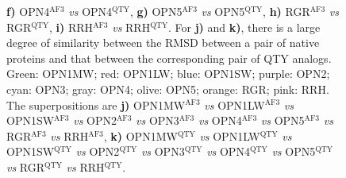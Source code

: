 \documentclass[fleqn, 10pt]{manuscript}
\begin{document}
\begin{figure}[htbp]
{    \textbf{f)} OPN4$^{\textrm{AF3}}$ \textit{vs} OPN4$^{\textrm{QTY}}$, 
    \textbf{g)} OPN5$^{\textrm{AF3}}$ \textit{vs} OPN5$^{\textrm{QTY}}$, 
    \textbf{h)} RGR$^{\textrm{AF3}}$ \textit{vs} RGR$^{\textrm{QTY}}$, 
    \textbf{i)} RRH$^{\textrm{AF3}}$ \textit{vs} RRH$^{\textrm{QTY}}$. 
    For \textbf{j)} and \textbf{k)}, there is a large degree of similarity between the RMSD between a pair of native proteins and that between the corresponding pair of QTY analogs. Green: OPN1MW; red: OPN1LW; blue: OPN1SW; purple: OPN2; cyan: OPN3; gray: OPN4; olive: OPN5; orange: RGR; pink: RRH. The superpositions are
    \textbf{j)} OPN1MW$^{\textrm{AF3}}$ \textit{vs} OPN1LW$^{\textrm{AF3}}$ \textit{vs} OPN1SW$^{\textrm{AF3}}$ \textit{vs} OPN2$^{\textrm{AF3}}$ \textit{vs} OPN3$^{\textrm{AF3}}$ \textit{vs} OPN4$^{\textrm{AF3}}$ \textit{vs} OPN5$^{\textrm{AF3}}$ \textit{vs} RGR$^{\textrm{AF3}}$ \textit{vs} RRH$^{\textrm{AF3}}$, 
    \textbf{k)} OPN1MW$^{\textrm{QTY}}$ \textit{vs} OPN1LW$^{\textrm{QTY}}$ \textit{vs} OPN1SW$^{\textrm{QTY}}$ \textit{vs} OPN2$^{\textrm{QTY}}$ \textit{vs} OPN3$^{\textrm{QTY}}$ \textit{vs} OPN4$^{\textrm{QTY}}$ \textit{vs} OPN5$^{\textrm{QTY}}$ \textit{vs} RGR$^{\textrm{QTY}}$ \textit{vs} RRH$^{\textrm{QTY}}$. 
    }
	\label{fig:humansup}
\end{figure}
\end{document}
